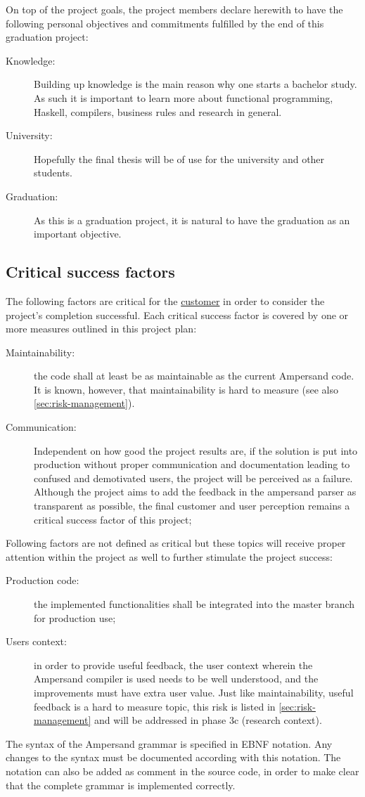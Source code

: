 On top of the project goals, the project members declare herewith to have the following personal objectives and commitments fulfilled by the end of this graduation project:
\begin{description}
	\item[Knowledge:] Building up knowledge is the main reason why one starts a bachelor study.
		As such it is important to learn more about functional programming, Haskell, compilers, business rules and research in general.
	\item[University:] Hopefully the final thesis will be of use for the university and other students.
	\item[Graduation:] As this is a graduation project, it is natural to have the graduation as an important objective.
\end{description}

\subsection{Critical success factors}
\label{subsec:success-factors}
The following factors are critical for the \underline{customer} in order to consider the project's completion successful.
Each critical success factor is covered by one or more measures outlined in this project plan:
\begin{description}
	\item[Maintainability:] the code shall at least be as maintainable as the current Ampersand code.
		It is known, however, that maintainability is hard to measure (see also \autoref{sec:risk-management}).
	\item[Communication:] Independent on how good the project results are, if the solution is put into production without proper communication and documentation leading to confused and demotivated users, the project will be perceived as a failure. 
	Although the project aims to add the feedback in the ampersand parser as transparent as possible, the final customer and user perception remains a critical success factor of this project;
\end{description}

Following factors are not defined as critical but these topics will receive proper attention within the project as well to further stimulate the project success:\begin{description}
	\item[Production code:] the implemented functionalities shall be integrated into the master branch for production use;
	\item[Users context:] in order to provide useful feedback, the user context wherein the Ampersand compiler is used needs to be well understood, and the improvements must have extra user value. 
		Just like maintainability, useful feedback is a hard to measure topic, this risk is listed in \autoref{sec:risk-management} and will be addressed in phase 3c (research context).
\end{description}
%
The syntax of the Ampersand grammar is specified in EBNF notation.
Any changes to the syntax must be documented according with this notation.
The notation can also be added as comment in the source code, in order to make clear that the complete grammar is implemented correctly.

